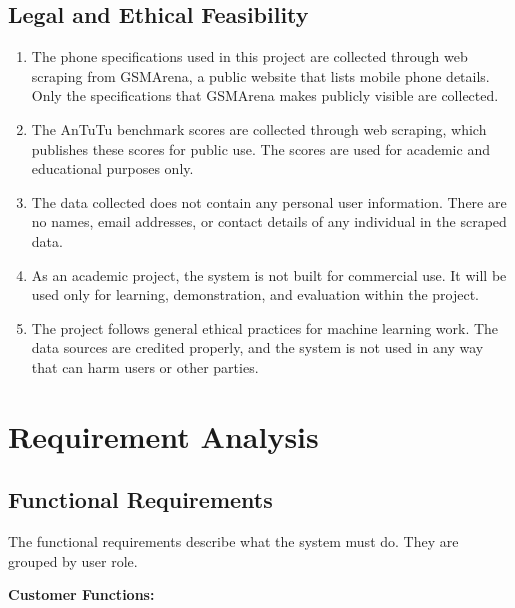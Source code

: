 \documentclass[12pt, a4paper]{report}
\numberwithin{equation}{chapter}
\begin{document}
\subsection{Legal and Ethical Feasibility}

\begin{enumerate}[label=\Roman*.]

\item The phone specifications used in this project are collected through web scraping from GSMArena, a public website that lists mobile phone details. Only the specifications that GSMArena makes publicly visible are collected.

\item The AnTuTu benchmark scores are collected through web scraping, which publishes these scores for public use. The scores are used for academic and educational purposes only.

\item The data collected does not contain any personal user information. There are no names, email addresses, or contact details of any individual in the scraped data.

\item As an academic project, the system is not built for commercial use. It will be used only for learning, demonstration, and evaluation within the project.

\item The project follows general ethical practices for machine learning work. The data sources are credited properly, and the system is not used in any way that can harm users or other parties.

\end{enumerate}

\section{Requirement Analysis}

\subsection{Functional Requirements}

The functional requirements describe what the system must do. They are grouped by user role.

\textbf{Customer Functions:}
\end{document}
